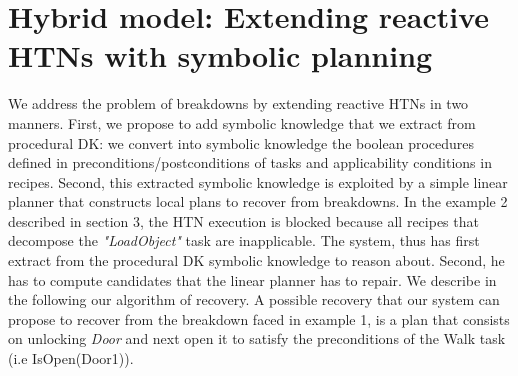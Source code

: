 \documentclass{llncs}
\begin{document}
		\section{Hybrid model: Extending reactive HTNs with symbolic planning}
		\par We address the problem of breakdowns  by extending reactive HTNs in two manners. First, we propose to add symbolic knowledge that we extract from  procedural DK: we convert into symbolic knowledge the boolean procedures defined in preconditions/postconditions of tasks and applicability conditions in recipes. Second, this extracted symbolic knowledge is exploited by a simple linear planner that constructs local plans to recover from  breakdowns. In the example 2 described in section 3, the HTN execution is blocked because all recipes that decompose the \textit{"LoadObject"} task are inapplicable. The system, thus has first  extract from the procedural DK symbolic knowledge to reason about. Second, he has to compute candidates that the linear planner has to repair. We describe in the following our algorithm of recovery. A possible recovery that our system can propose to recover from the breakdown faced in example 1, is a plan that consists on unlocking \textit{Door} and next open it to satisfy the preconditions of the Walk task (i.e IsOpen(Door1)).
	
\end{document}
